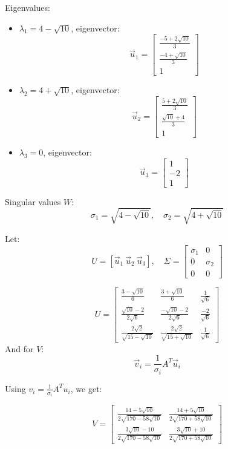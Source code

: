 \documentclass[12pt]{article}
\begin{document}
\begin{enumerate}[leftmargin=0em]
Eigenvalues:
\begin{itemize}
    \item \( \lambda_1 = 4 - \sqrt{10} \), eigenvector:
    \[
    \vec{u}_1 = \begin{bmatrix}
    \frac{-5 + 2\sqrt{10}}{3} \\
    \frac{-4 + \sqrt{10}}{3} \\
    1
    \end{bmatrix}
    \]

    \item \( \lambda_2 = 4 + \sqrt{10} \), eigenvector:
    \[
    \vec{u}_2 = \begin{bmatrix}
    \frac{5 + 2\sqrt{10}}{3} \\
    \frac{\sqrt{10} + 4}{3} \\
    1
    \end{bmatrix}
    \]

    \item \( \lambda_3 = 0 \), eigenvector:
    \[
    \vec{u}_3 = \begin{bmatrix}
    1 \\
    -2 \\
    1
    \end{bmatrix}
    \]
\end{itemize}

Singular values \( W \):
\[
\sigma_1 = \sqrt{4 - \sqrt{10}}, \quad \sigma_2 = \sqrt{4 + \sqrt{10}}
\]

Let:
\[
U = [\vec{u}_1 \ \vec{u}_2 \ \vec{u}_3], \quad
\Sigma = \begin{bmatrix}
\sigma_1 & 0 \\
0 & \sigma_2 \\
0 & 0
\end{bmatrix}
\]


\[
U = \begin{bmatrix}
\frac{3 - \sqrt{10}}{6} & \frac{3 + \sqrt{10}}{6} & \frac{1}{\sqrt{6}} \\
\frac{\sqrt{10} - 2}{2\sqrt{6}} & \frac{-\sqrt{10} - 2}{2\sqrt{6}} & \frac{-2}{\sqrt{6}} \\
\frac{2\sqrt{2}}{\sqrt{15 - \sqrt{10}}} & \frac{2\sqrt{2}}{\sqrt{15 + \sqrt{10}}} & \frac{1}{\sqrt{6}}
\end{bmatrix}
\]
And for \( V \):
\[
\vec{v}_i = \frac{1}{\sigma_i} A^T \vec{u}_i
\]


Using \( v_i = \frac{1}{\sigma_i} A^T u_i \), we get:

\[
V = \begin{bmatrix}
\frac{14 - 5\sqrt{10}}{2\sqrt{170 - 58\sqrt{10}}} & \frac{14 + 5\sqrt{10}}{2\sqrt{170 + 58\sqrt{10}}} \\
\frac{3\sqrt{10} - 10}{2\sqrt{170 - 58\sqrt{10}}} & \frac{3\sqrt{10} + 10}{2\sqrt{170 + 58\sqrt{10}}}
\end{bmatrix}
\]


\end{enumerate}
\end{document}
